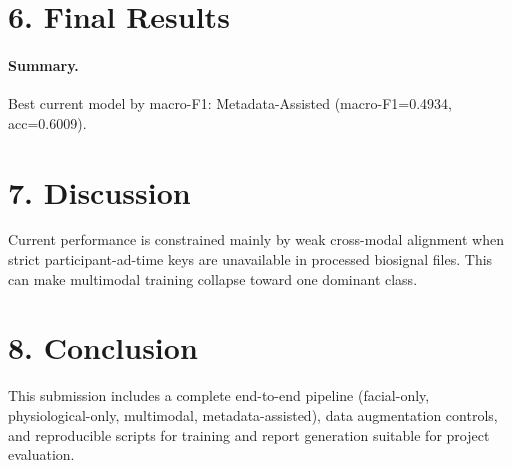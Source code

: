 \documentclass[11pt]{article}
\begin{document}
\section*{6. Final Results}
\begin{table}[h]
\centering
\small
\setlength{\tabcolsep}{4pt}
\end{table}

\paragraph{Summary.} Best current model by macro-F1: Metadata-Assisted (macro-F1=0.4934, acc=0.6009).

\section*{7. Discussion}
Current performance is constrained mainly by weak cross-modal alignment when strict participant-ad-time keys are unavailable in processed biosignal files.
This can make multimodal training collapse toward one dominant class.

\section*{8. Conclusion}
This submission includes a complete end-to-end pipeline (facial-only, physiological-only, multimodal, metadata-assisted), data augmentation controls,
and reproducible scripts for training and report generation suitable for project evaluation.
\end{document}
